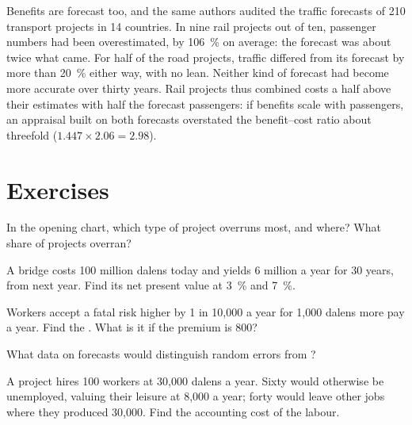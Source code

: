 \begin{record}
Benefits are forecast too, and the same authors audited the traffic forecasts of
210 transport projects in 14 countries. In nine rail projects out of ten, passenger
numbers had been overestimated, by 106~\% on average: the forecast was about twice
what came. For half of the road projects, traffic differed from its forecast by
more than 20~\% either way, with no lean. Neither kind of forecast had become more
accurate over thirty years. %
Rail projects thus combined costs a half above their estimates with half the
forecast passengers: if benefits scale with passengers, an appraisal built on
both forecasts overstated the benefit--cost ratio about threefold
($1.447 \times 2.06 = 2.98$).
\end{record}

\section{Exercises}\label{sec:b3:cost-benefit-analysis:exercises}

\begin{exercise}[$\star$]\label{exo:b3:cost-benefit-analysis:1}
In the opening chart, which type of project overruns most, and where? What share
of projects overran?
\end{exercise}

\begin{exercise}[$\star$]\label{exo:b3:cost-benefit-analysis:2}
A bridge costs 100 million dalens today and yields 6 million a year for 30 years,
from next year. Find its net present value at 3~\% and 7~\%.
\end{exercise}

\begin{exercise}[$\star$]\label{exo:b3:cost-benefit-analysis:3}
Workers accept a fatal risk higher by 1 in 10{,}000 a year for 1{,}000 dalens more pay a
year. Find the . What is it if the premium is 800?
\end{exercise}

\begin{exercise}[$\star$]\label{exo:b3:cost-benefit-analysis:4}
What data on forecasts would distinguish random errors from ?
\end{exercise}

\begin{exercise}[$\star\star$]\label{exo:b3:cost-benefit-analysis:5}
A project hires 100 workers at 30{,}000 dalens a year. Sixty would otherwise be
unemployed, valuing their leisure at 8{,}000 a year; forty would leave other jobs where
they produced 30{,}000. Find the accounting cost of the labour.
\end{exercise}

